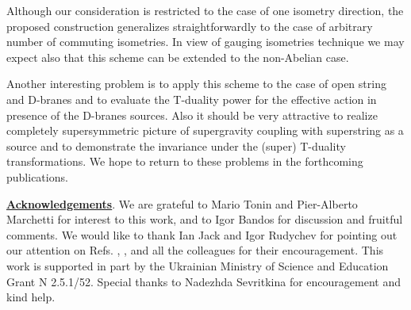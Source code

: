 \documentclass[a4paper,11pt]{article}
\begin{document}
Although our consideration is restricted to the case of one isometry 
direction, the proposed construction generalizes straightforwardly to the case 
of arbitrary number of commuting isometries. In view of gauging isometries
technique we may expect also that this scheme can be extended to the 
non-Abelian case. 


Another interesting problem is to apply this scheme to the case of open 
string and D-branes and to evaluate the T-duality power for the effective 
action in presence of the D-branes sources. Also it should be very attractive 
to realize completely supersymmetric picture of supergravity coupling with 
superstring as a source and to demonstrate the invariance under the (super) 
T-duality transformations. We hope to return to these problems in the
forthcoming publications.

\vspace{0.8cm}
{\bf \underline{Acknowledgements}}. We are grateful to Mario Tonin and 
Pier-Alberto Marchetti for interest to this work, and to Igor Bandos for
discussion and fruitful comments. We would like to thank Ian Jack and
Igor Rudychev for pointing out our attention on Refs. \cite{jjmo}, \cite{ps}, 
and all the colleagues for their encouragement.  
This work is supported in part by the
Ukrainian Ministry of Science and Education Grant N 2.5.1/52. Special
thanks to Nadezhda Sevritkina for encouragement and kind help.
        
 
\end{document}
